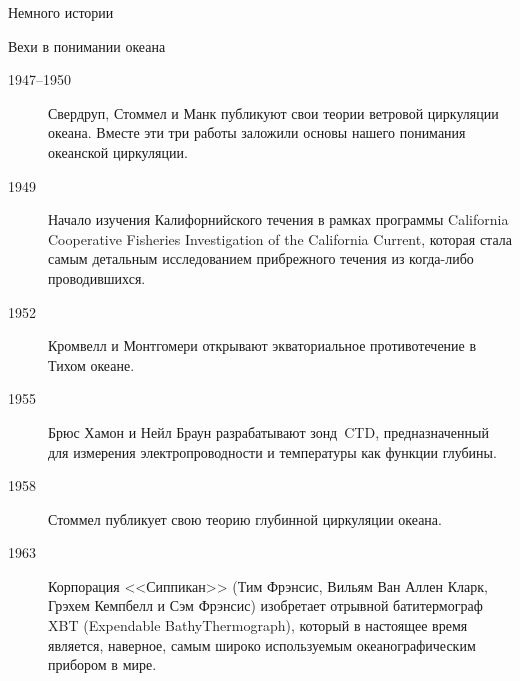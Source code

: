 \begin{chapter}{Немного истории}
\begin{section}{Вехи в понимании океана}
\begin{description}
\item[1947--1950] Свердруп, Стоммел и Манк публикуют свои теории
ветровой циркуляции океана. Вместе эти три работы заложили основы
нашего понимания океанской циркуляции.
%

\item[1949] Начало изучения Калифорнийского течения в рамках программы
California Cooperative Fisheries Investigation of the California
Current, которая стала самым детальным исследованием прибрежного течения
из когда-либо проводившихся.
%


\item[1952] Кромвелл и Монтгомери открывают экваториальное
противотечение в Тихом океане.
%


\item[1955] Брюс Хамон и Нейл Браун разрабатывают зонд~CTD, предназначенный
для измерения электропроводности и температуры как функции глубины.
%

\item[1958] Стоммел публикует свою теорию глубинной циркуляции океана.
%

\item[1963] Корпорация <<Сиппикан>> (Тим Фрэнсис,
Вильям Ван Аллен Кларк, Грэхем Кемпбелл и Сэм Фрэнсис) изобретает
отрывной батитермограф XBT (Expendable BathyThermograph), который 
в настоящее время является, наверное, самым широко используемым 
океанографическим прибором в мире.
%


\end{description}
\end{section}
\end{chapter}

